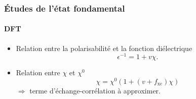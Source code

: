 \documentclass[a4paper, 12pt, twoside, titlepage, french]{beamer}
\begin{document}
\begin{frame}
\frametitle{Études de l'état fondamental}
\framesubtitle{DFT}
\begin{itemize}
\item Relation entre la polarisabilité  et la fonction diélectrique
\begin{equation*}
  \epsilon^{-1} = 1+ v\chi.
\end{equation*}
\item Relation entre $\chi$ et $\chi^0$
\begin{equation*}
\chi = \chi^0 ( 1 + (v+f_{\textrm{xc}})\chi)
\end{equation*}
$\Longrightarrow$ terme d'échange-corrélation à approximer.
\end{itemize}
 
\end{frame}



\end{document}
